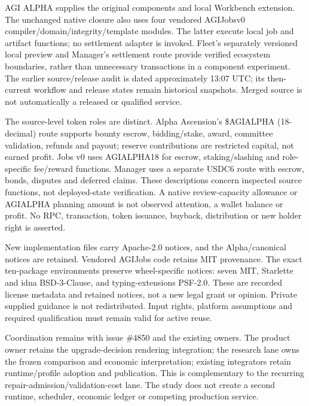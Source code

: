 \documentclass[11pt,a4paper]{article}
\newcommand{\Alpha}{AGI ALPHA}
\begin{document}
\Alpha{} supplies the original components and local Workbench extension. The unchanged native closure also uses four vendored AGIJobsv0 compiler/domain/integrity/template modules. The latter execute local job and artifact functions; no settlement adapter is invoked. Fleet's separately versioned local preview and Manager's settlement route provide verified ecosystem boundaries, rather than unnecessary transactions in a component experiment. The earlier source/release audit is dated approximately 13:07 UTC; its then-current workflow and release states remain historical snapshots. Merged source is not automatically a released or qualified service.\cite{ecosystem}

The source-level token roles are distinct. Alpha Ascension's \$AGIALPHA (18-decimal) route supports bounty escrow, bidding/stake, award, committee validation, refunds and payout; reserve contributions are restricted capital, not earned profit. Jobs v0 uses AGIALPHA18 for escrow, staking/slashing and role-specific fee/reward functions. Manager uses a separate USDC6 route with escrow, bonds, disputes and deferred claims. These descriptions concern inspected source functions, not deployed-state verification. A native review-capacity allowance or AGIALPHA planning amount is not observed attention, a wallet balance or profit. No RPC, transaction, token issuance, buyback, distribution or new holder right is asserted.\cite{ascension,jobs,manager,ecosystem}

New implementation files carry Apache-2.0 notices, and the Alpha/canonical notices are retained. Vendored AGIJobs code retains MIT provenance. The exact ten-package environments preserve wheel-specific notices: seven MIT, Starlette and idna BSD-3-Clause, and typing-extensions PSF-2.0. These are recorded license metadata and retained notices, not a new legal grant or opinion. Private supplied guidance is not redistributed. Input rights, platform assumptions and required qualification must remain valid for active reuse.\cite{ecosystem,companion}

Coordination remains with issue \#4850 and the existing owners. The product owner retains the upgrade-decision rendering integration; the research lane owns the frozen comparison and economic interpretation; existing integrators retain runtime/profile adoption and publication. This is complementary to the recurring repair-admission/validation-cost lane. The study does not create a second runtime, scheduler, economic ledger or competing production service.\cite{coordination,ecosystem}
\end{document}
